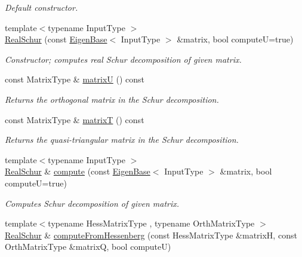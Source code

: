 \begin{DoxyCompactItemize}
\begin{DoxyCompactList}\small\item\em Default constructor. \end{DoxyCompactList}\item 
{\footnotesize template$<$typename Input\+Type $>$ }\\\hyperlink{group___eigenvalues___module_afef4d3dc5a493aca2760c20b34337016}{Real\+Schur} (const \hyperlink{group___core___module_struct_eigen_1_1_eigen_base}{Eigen\+Base}$<$ Input\+Type $>$ \&matrix, bool computeU=true)
\begin{DoxyCompactList}\small\item\em Constructor; computes real Schur decomposition of given matrix. \end{DoxyCompactList}\item 
const Matrix\+Type \& \hyperlink{group___eigenvalues___module_a85622ccbecff99c8933d21f0a22b22bb}{matrixU} () const
\begin{DoxyCompactList}\small\item\em Returns the orthogonal matrix in the Schur decomposition. \end{DoxyCompactList}\item 
const Matrix\+Type \& \hyperlink{group___eigenvalues___module_abb78996b43b8642a5f507415730445cb}{matrixT} () const
\begin{DoxyCompactList}\small\item\em Returns the quasi-\/triangular matrix in the Schur decomposition. \end{DoxyCompactList}\item 
{\footnotesize template$<$typename Input\+Type $>$ }\\\hyperlink{group___eigenvalues___module_class_eigen_1_1_real_schur}{Real\+Schur} \& \hyperlink{group___eigenvalues___module_a60caf9ffad11d728ea458c4dd36d0a98}{compute} (const \hyperlink{group___core___module_struct_eigen_1_1_eigen_base}{Eigen\+Base}$<$ Input\+Type $>$ \&matrix, bool computeU=true)
\begin{DoxyCompactList}\small\item\em Computes Schur decomposition of given matrix. \end{DoxyCompactList}\item 
{\footnotesize template$<$typename Hess\+Matrix\+Type , typename Orth\+Matrix\+Type $>$ }\\\hyperlink{group___eigenvalues___module_class_eigen_1_1_real_schur}{Real\+Schur} \& \hyperlink{group___eigenvalues___module_ac4acc917dcaddefae5f35acd2c536d65}{compute\+From\+Hessenberg} (const Hess\+Matrix\+Type \&matrixH, const Orth\+Matrix\+Type \&matrixQ, bool computeU)

\end{DoxyCompactItemize}
